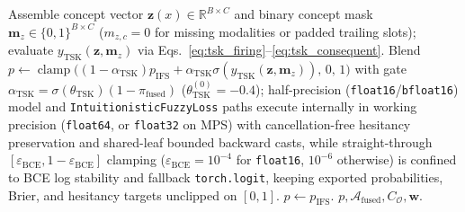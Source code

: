 \documentclass[10pt,twocolumn]{article}
\begin{document}
\begin{algorithm}[t]
\begin{algorithmic}[1]
    \State Assemble concept vector $\bm{z}(x) \in \mathbb{R}^{B \times C}$ and binary concept
    mask $\bm{m}_z \in \{0,1\}^{B \times C}$ ($m_{z,c}=0$ for missing modalities or padded
    trailing slots); evaluate $y_{\text{TSK}}(\bm{z}, \bm{m}_z)$ via
    Eqs.~\eqref{eq:tsk_firing}--\eqref{eq:tsk_consequent}.
    \State Blend $p \gets \operatorname{clamp}\big((1 - \alpha_{\text{TSK}})p_{\text{IFS}} +
    \alpha_{\text{TSK}}\sigma(y_{\text{TSK}}(\bm{z}, \bm{m}_z)),\, 0,\, 1\big)$ with gate
    $\alpha_{\text{TSK}} = \sigma(\theta_{\text{TSK}})(1 - \pi_{\text{fused}})$
    ($\theta_{\text{TSK}}^{(0)}=-0.4$); half-precision (\texttt{float16}/\texttt{bfloat16})
    model and \texttt{IntuitionisticFuzzyLoss} paths execute internally in working precision
    (\texttt{float64}, or \texttt{float32} on MPS) with cancellation-free hesitancy
    preservation and shared-leaf bounded backward casts, while straight-through
    $[\varepsilon_{\text{BCE}}, 1-\varepsilon_{\text{BCE}}]$ clamping
    ($\varepsilon_{\text{BCE}}=10^{-4}$ for \texttt{float16}, $10^{-6}$ otherwise) is confined
    to BCE log stability and fallback \texttt{torch.logit}, keeping exported probabilities,
    Brier, and hesitancy targets unclipped on $[0, 1]$.
\Else
    \State $p \gets p_{\text{IFS}}$.
\EndIf
\State \Return $p, \mathcal{A}_{\text{fused}}, C_{\mathcal{O}}, \bm{w}$.
\end{algorithmic}
\end{algorithm}
\end{document}
